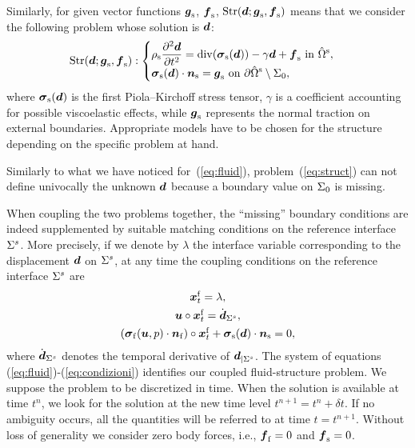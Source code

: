 Similarly, for given vector functions $\boldsymbol{g}_{\mathrm{s}}$, $\boldsymbol{f}_{\mathrm{s}}$, $\operatorname{Str}({\boldsymbol{d}};\boldsymbol{g}_{\mathrm{s}}, \boldsymbol{f}_{\mathrm{s}})$ means that
we consider the following problem whose solution is ${\boldsymbol{d}}$:
\begin{equation}\label{eq:struct}
  \operatorname{Str}({\boldsymbol{d}};\boldsymbol{g}_{\mathrm{s}}, \boldsymbol{f}_{\mathrm{s}}) :
  \begin{cases}
    \displaystyle  \rho_{\mathrm{s}} \frac{\partial^2 {\boldsymbol{d}}}{\partial t^2} = \operatorname{div}(\boldsymbol{\sigma}_{\mathrm{s}}({\boldsymbol{d}}))
    -\gamma {\boldsymbol{d}} +\boldsymbol{f}_{\mathrm{s}} \text{ in }\hat\Omega^{{\mathrm{s}}}, \\
    \displaystyle  \boldsymbol{\sigma}_{\mathrm{s}}({\boldsymbol{d}}) \cdot {\boldsymbol{n}}_{\mathrm{s}} = \boldsymbol{g}_{\mathrm{s}}
    \text{ on }\partial\hat\Omega^{{\mathrm{s}}}\setminus\Sigma_0,
  \end{cases}
\end{equation}
where $\boldsymbol{\sigma}_{\mathrm{s}}({\boldsymbol{d}})$ is the first Piola--Kirchoff stress tensor,
$\gamma$ is a coefficient accounting for possible viscoelastic
effects, while $\boldsymbol{g}_{\mathrm{s}}$ represents the normal traction on
external boundaries. Appropriate models have to be chosen for the
structure depending on the specific problem at hand.

Similarly to what we have noticed for~(\ref{eq:fluid}),
problem~(\ref{eq:struct}) can not define univocally the unknown
${\boldsymbol{d}}$ because a boundary value on $\Sigma_0$ is missing.

When coupling the two problems together, the ``missing'' boundary
conditions are indeed supplemented by suitable matching
conditions on the reference interface $\Sigma^s$. More precisely,
if we denote by $\lambda$ the interface variable corresponding to
the displacement ${\boldsymbol{d}}$ on $\Sigma^s$, at any time the coupling
conditions on the reference interface $\Sigma^s$ are
\begin{equation}\label{eq:condizioni}
\begin{array}{c}
  {\boldsymbol{x}^{\mathrm{f}}_{t}} = \lambda ,\\[4pt]
  {\boldsymbol{u}} \circ {\boldsymbol{x}^{\mathrm{f}}_{t}} = \dot{{\boldsymbol{d}}}_{\Sigma^s} ,\\[4pt]
  (\boldsymbol{\sigma}_{\mathrm{f}}({\boldsymbol{u}},p) \cdot {\boldsymbol{n}}_{\mathrm{f}}) \circ {\boldsymbol{x}^{\mathrm{f}}_{t}} +
  \boldsymbol{\sigma}_{\mathrm{s}}({\boldsymbol{d}})\cdot {\boldsymbol{n}}_{\mathrm{s}} =0,
\end{array}
\end{equation}
where $\dot{{\boldsymbol{d}}}_{\Sigma^s}$ denotes the temporal derivative of
${\boldsymbol{d}}_{\vert\Sigma^s}$. The system of equations (\ref{eq:fluid})-(\ref{eq:condizioni})
identifies our coupled fluid-structure problem.
We suppose the problem to be discretized in time. When the
solution is available at time $t^n$, we look for the solution at
the new time level $t^{n+1} = t^n + \delta t$. If no ambiguity
occurs,  all the quantities will be referred to at time
$t=t^{n+1}$.
Without loss of generality we consider zero body forces, i.e.,
$\boldsymbol{f}_{\mathrm{f}} =0$ and $\boldsymbol{f}_{\mathrm{s}}=0$.

